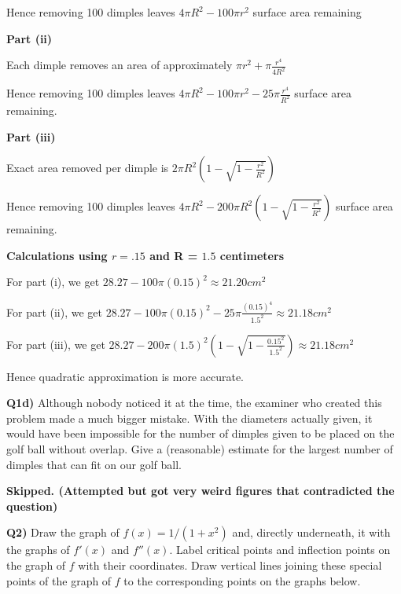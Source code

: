 \documentclass[9pt]{article}
\begin{document}
Hence removing 100 dimples leaves $4 \pi R^2 - 100 \pi r^2$ surface area remaining

\textbf{Part (ii)}

Each dimple removes an area of approximately $\pi r^2 + \pi \frac{r^4}{4R^2}$

Hence removing 100 dimples leaves $4 \pi R^2 - 100 \pi r^2 - 25 \pi \frac{r^4}{R^2}$ surface area remaining.

\textbf{Part (iii)}

Exact area removed per dimple is $2 \pi R^2 (1 - \sqrt{1 - \frac{r^2}{R^2}})$

Hence removing 100 dimples leaves $4 \pi R^2 - 200 \pi R^2 (1 - \sqrt{1 - \frac{r^2}{R^2}})$ surface area remaining.

\textbf{Calculations using $r = .15$ and R = $1.5$ centimeters}

For part (i), we get $28.27 - 100 \pi (0.15)^2 \approx 21.20 cm^2$

For part (ii), we get $28.27 - 100 \pi (0.15)^2 - 25 \pi \frac{(0.15)^4}{1.5^2} \approx 21.18 cm^2$

For part (iii), we get $28.27 - 200 \pi (1.5)^2 (1 - \sqrt{1 - \frac{0.15^2}{1.5^2}}) \approx 21.18cm^2$

Hence quadratic approximation is more accurate.


\begin{tcolorbox}
  \textbf{Q1d)} Although nobody noticed it at the time, the examiner who created this problem made a much bigger mistake. With the diameters actually given, it would have been impossible for the number of dimples given to be placed on the golf ball without overlap. Give a (reasonable) estimate for the largest number of dimples that can fit on our golf ball.
\end{tcolorbox}

\textbf{Skipped. (Attempted but got very weird figures that contradicted the question)}


\begin{tcolorbox}
  \textbf{Q2)} Draw the graph of $f(x) = 1/(1 + x^2)$ and, directly underneath, it with the graphs of $f'(x)$ and $f''(x)$. Label critical points and inflection points on the graph of $f$ with their coordinates. Draw vertical lines joining these special points of the graph of $f$ to the corresponding points on the graphs below.
\end{tcolorbox}
\end{document}
